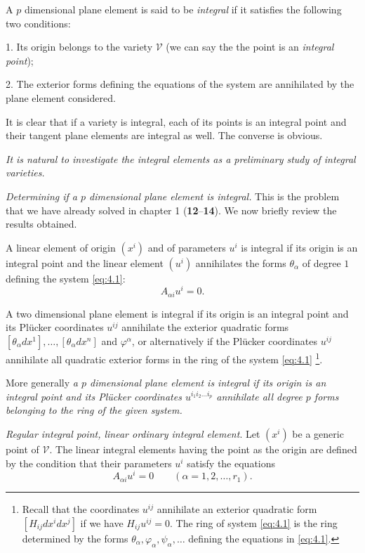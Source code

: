 \documentclass[leqno,11pt]{book}
\numberwithin{equation}{chapter}
\theoremstyle{shape1}
\theoremstyle{shape0}
\theoremstyle{shape2}
\theoremstyle{definition}
\begin{document}
A $p$ dimensional plane element is said to be \emph{integral} if it satisfies the following two conditions:

1. Its origin belongs to the variety $\mathcal{V}$ (we can say the the point is an \emph{integral point});

2. The exterior forms defining the equations of the system are annihilated by the plane element considered.

It is clear that if a variety is integral, each of its points is an integral point and their tangent plane elements are integral as well. The converse is obvious.

\emph{It is natural to investigate the integral elements as a preliminary study of integral varieties.}

\vspace{12pt}\fsec \emph{Determining if a $p$ dimensional plane element is integral.} This is the problem that we have already solved in chapter 1 (\textsection\textbf{12}--\textbf{14}). We now briefly review the results obtained.

A linear element of origin $(x^{i})$ and of parameters $u^{i}$ is integral if its origin is an integral point and the linear element $(u^{i})$ annihilates the forms $\theta_{\alpha}$ of degree $1$ defining the system \eqref{eq:4.1}:
\[
A_{\alpha i}u^{i}=0.
\]

A two dimensional plane element is integral if its origin is an integral point and its Pl\"ucker coordinates $u^{ij}$ annihilate the exterior quadratic forms $[\theta_{\alpha}dx^{1}],\dots,[\theta_{\alpha}dx^{n}]$ and $\varphi^{\alpha}$, or alternatively if the Pl\"ucker coordinates $u^{ij}$ annihilate all quadratic exterior forms in the ring of the system \eqref{eq:4.1} \footnote{Recall that the coordinates $u^{ij}$ annihilate an exterior quadratic form $[H_{ij}dx^{i}dx^{j}]$ if we have $H_{ij}u^{ij}=0$. The ring of system \eqref{eq:4.1} is the ring determined by the forms $\theta_{\alpha},\varphi_{\alpha},\psi_{\alpha},\dots$ defining the equations in \eqref{eq:4.1}.}.

More generally \emph{a $p$ dimensional plane element is integral if its origin is an integral point and its Pl\"ucker coordinates $u^{i_{1}i_{2}\dots i_{p}}$ annihilate all degree $p$ forms belonging to the ring of the given system.}


\vspace{12pt}\fsec \emph{Regular integral point, linear ordinary integral element}. Let $(x^{i})$ be a generic point of $\mathcal{V}$. The linear integral elements having the point as the origin are defined by the condition that their parameters $u^{i}$ satisfy the equations
\begin{equation}
  \label{eq:4.2}
  A_{\alpha i}u^{i}=0\qquad(\alpha=1,2,\dots,r_{1}).
\end{equation}
\end{document}
